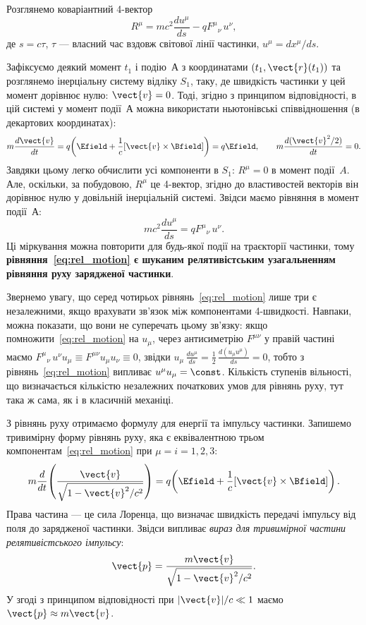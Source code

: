 Розглянемо коваріантний 4-вектор
\begin{equation*}
    R^{\mu} = mc^2\frac{du^{\mu}}{ds} - qF^{\mu}{}_{\nu}\,u^{\nu},
\end{equation*}
де $s=c\tau$, $\tau$ --- власний час вздовж світової лінії частинки, $u^{\mu}=dx^{\mu}/ds$.

Зафіксуємо деякий момент $t_1$ і подію~А з координатами $(t_1,\vect{r}(t_1))$ та розглянемо інерціальну систему відліку $S_1$, таку, де швидкість частинки у цей момент дорівнює нулю: $\vect{v}=0$. Тоді, згідно з принципом відповідності, в цій системі у момент події~А можна використати ньютонівські співвідношення (в декартових координатах):
\begin{equation*}
    m\frac{d\vect{v}}{dt} = q\!\left(\Efield
    + \frac{1}{c}[\vect{v}\times\Bfield]\right) = q\Efield,
    \qquad
    m\frac{d(\vect{v}^2/2)}{dt} = 0.
\end{equation*}
Завдяки цьому легко обчислити усі компоненти в $S_1$: $R^{\mu}=0$ в момент події~$A$. Але, оскільки, за побудовою, $R^{\mu}$ це 4-вектор, згідно до властивостей векторів він дорівнює нулю у довільній інерціальній системі. Звідси маємо рівняння в момент події~А:
\begin{equation}\label{eq:rel_motion}
    mc^2\frac{du^{\mu}}{ds} = qF^{\mu}{}_{\nu}\,u^{\nu}.
\end{equation}
Ці міркування можна повторити для будь-якої події на траєкторії частинки, тому \textbf{рівняння~\eqref{eq:rel_motion} є шуканим релятивістським узагальненням рівняння руху зарядженої частинки}.

Звернемо увагу, що серед чотирьох рівнянь~\eqref{eq:rel_motion} лише три є незалежними, якщо врахувати зв'язок між компонентами 4-швидкості. Навпаки, можна показати, що вони не суперечать цьому зв'язку: якщо помножити~\eqref{eq:rel_motion} на $u_{\mu}$, через антисиметрію $F^{\mu\nu}$ у правій частині маємо $F^{\mu}{}_{\nu}\,u^{\nu}u_{\mu} \equiv F^{\mu\nu}u_{\mu}u_{\nu} \equiv 0$, звідки $u_{\mu}\,\frac{du^{\mu}}{ds} = \frac12\,\frac{d(u_{\mu}u^{\mu})}{ds} = 0$, тобто з рівнянь~\eqref{eq:rel_motion} випливає $u^{\mu}u_{\mu}=\const$. Кількість ступенів вільності, що визначається кількістю незалежних початкових умов для рівнянь руху, тут така ж сама, як і в класичній механіці.

З рівнянь руху отримаємо формулу для енергії та імпульсу частинки. Запишемо тривимірну форму рівнянь руху, яка є еквівалентною трьом компонентам~\eqref{eq:rel_motion} при $\mu=i=1,2,3$:
\begin{equation*}
    m\frac{d}{dt}\!\left(\frac{\vect{v}}{\sqrt{1-\vect{v}^2/c^2}}\right)
    = q\!\left(\Efield + \frac{1}{c}[\vect{v}\times\Bfield]\right).
\end{equation*}
Права частина --- це сила Лоренца, що визначає швидкість передачі імпульсу від поля до зарядженої частинки. Звідси випливає \emph{вираз для тривимірної частини релятивістського імпульсу}:
\begin{equation*}
    \vect{p} = \frac{m\vect{v}}{\sqrt{1-\vect{v}^2/c^2}}.
\end{equation*}
У згоді з принципом відповідності при $|\vect{v}|/c\ll 1$ маємо $\vect{p}\approx m\vect{v}$.

